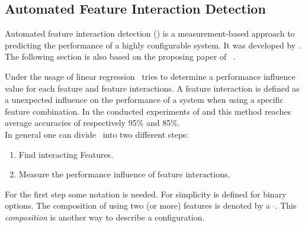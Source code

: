 

\subsection{Automated Feature Interaction Detection}\label{sec:AFID}

Automated feature interaction detection (\AFID) is a measurement-based approach to predicting the performance of a highly configurable system.
It was developed by \citet{AutomatedFeatureDetectionSiegmund2012}. The following section is also based on the proposing paper of \AFID~\cite{AutomatedFeatureDetectionSiegmund2012}. 

Under the usage of linear regression \AFID~tries to determine a performance influence value for each feature and feature interactions. A feature interaction is defined as a unexpected influence on the performance of a system when using a specific feature combination.
In the conducted experiments of \citet{AutomatedFeatureDetectionSiegmund2012} and \citet{CostEfficientSampling_Gou_Siegmund_2015} this method reaches average accuracies of  respectively 95\% and 85\%.
\\
\noindent
In general one can divide \AFID~into two different steps:
\begin{enumerate}
	\item Find interacting Features.
	\item Measure the performance influence of feature interactions.
\end{enumerate}
For the first step some notation is needed. For simplicity \AFID is defined for binary options.
The composition of using two (or more) features is denoted by a $\cdot$. This \textit{composition} is another way to describe a configuration.




